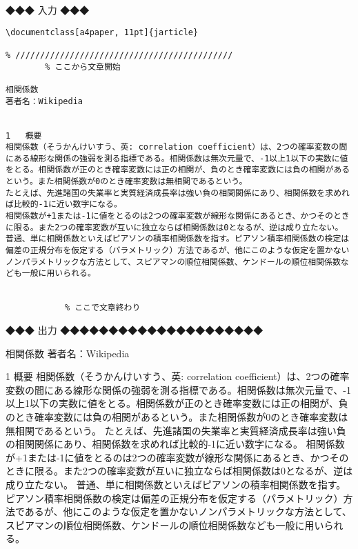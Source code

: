 \vspace{\Cvs}
\noindent
◆◆◆ 入力 ◆◆◆
\begin{lstlisting}[basicstyle=\gt\ttfamily\footnotesize, frame=single]
\documentclass[a4paper, 11pt]{jarticle}

% ////////////////////////////////////////////
		% ここから文章開始

相関係数
著者名：Wikipedia


1	概要
相関係数（そうかんけいすう、英: correlation coefficient）は、2つの確率変数の間にある線形な関係の強弱を測る指標である。相関係数は無次元量で、-1以上1以下の実数に値をとる。相関係数が正のとき確率変数には正の相関が、負のとき確率変数には負の相関があるという。また相関係数が0のとき確率変数は無相関であるという。
たとえば、先進諸国の失業率と実質経済成長率は強い負の相関関係にあり、相関係数を求めれば比較的-1に近い数字になる。
相関係数が+1または-1に値をとるのは2つの確率変数が線形な関係にあるとき、かつそのときに限る。また2つの確率変数が互いに独立ならば相関係数は0となるが、逆は成り立たない。
普通、単に相関係数といえばピアソンの積率相関係数を指す。ピアソン積率相関係数の検定は偏差の正規分布を仮定する（パラメトリック）方法であるが、他にこのような仮定を置かないノンパラメトリックな方法として、スピアマンの順位相関係数、ケンドールの順位相関係数なども一般に用いられる。


			% ここで文章終わり
\end{lstlisting}



\vspace{\Cvs}
\noindent
◆◆◆ 出力 ◆◆◆◆◆◆◆◆◆◆◆◆◆◆◆◆◆◆◆◆◆

相関係数
著者名：Wikipedia


1	概要
相関係数（そうかんけいすう、英: correlation coefficient）は、2つの確率変数の間にある線形な関係の強弱を測る指標である。相関係数は無次元量で、-1以上1以下の実数に値をとる。相関係数が正のとき確率変数には正の相関が、負のとき確率変数には負の相関があるという。また相関係数が0のとき確率変数は無相関であるという。
たとえば、先進諸国の失業率と実質経済成長率は強い負の相関関係にあり、相関係数を求めれば比較的-1に近い数字になる。
相関係数が+1または-1に値をとるのは2つの確率変数が線形な関係にあるとき、かつそのときに限る。また2つの確率変数が互いに独立ならば相関係数は0となるが、逆は成り立たない。
普通、単に相関係数といえばピアソンの積率相関係数を指す。ピアソン積率相関係数の検定は偏差の正規分布を仮定する（パラメトリック）方法であるが、他にこのような仮定を置かないノンパラメトリックな方法として、スピアマンの順位相関係数、ケンドールの順位相関係数なども一般に用いられる。

